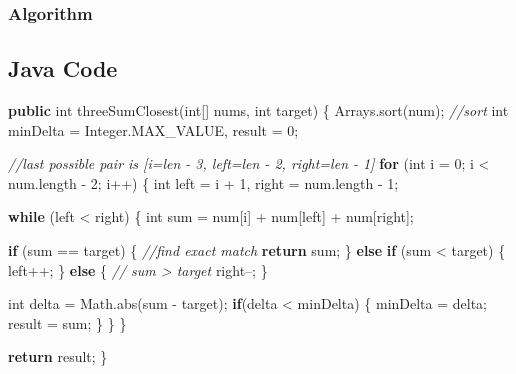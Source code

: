 \documentclass[]{book}
\newenvironment{Shaded}{\begin{snugshade}}{\end{snugshade}}
\newcommand{\BuiltInTok}[1]{#1}
\newcommand{\CommentTok}[1]{\textcolor[rgb]{0.56,0.35,0.01}{\textit{#1}}}
\newcommand{\DataTypeTok}[1]{\textcolor[rgb]{0.13,0.29,0.53}{#1}}
\newcommand{\DecValTok}[1]{\textcolor[rgb]{0.00,0.00,0.81}{#1}}
\newcommand{\FunctionTok}[1]{\textcolor[rgb]{0.00,0.00,0.00}{#1}}
\newcommand{\KeywordTok}[1]{\textcolor[rgb]{0.13,0.29,0.53}{\textbf{#1}}}
\newcommand{\NormalTok}[1]{#1}
\begin{document}
\hypertarget{algorithm-6}{%
\subsubsection{Algorithm}\label{algorithm-6}}

\hypertarget{java-code-4}{%
\subsection{Java Code}\label{java-code-4}}

\begin{Shaded}
\begin{Highlighting}[]
\KeywordTok{public} \DataTypeTok{int} \FunctionTok{threeSumClosest}\NormalTok{(}\DataTypeTok{int}\NormalTok{[] nums, }\DataTypeTok{int}\NormalTok{ target) \{}
    \BuiltInTok{Arrays}\NormalTok{.}\FunctionTok{sort}\NormalTok{(num); }\CommentTok{//sort}
    \DataTypeTok{int}\NormalTok{ minDelta = }\BuiltInTok{Integer}\NormalTok{.}\FunctionTok{MAX_VALUE}\NormalTok{, result = }\DecValTok{0}\NormalTok{;}

    \CommentTok{//last possible pair is [i=len - 3, left=len - 2, right=len - 1]}
    \KeywordTok{for}\NormalTok{ (}\DataTypeTok{int}\NormalTok{ i = }\DecValTok{0}\NormalTok{; i < num.}\FunctionTok{length}\NormalTok{ - }\DecValTok{2}\NormalTok{; i++) \{}
        \DataTypeTok{int}\NormalTok{ left = i + }\DecValTok{1}\NormalTok{, right = num.}\FunctionTok{length}\NormalTok{ - }\DecValTok{1}\NormalTok{;}

        \KeywordTok{while}\NormalTok{ (left < right) \{}
            \DataTypeTok{int}\NormalTok{ sum = num[i] + num[left] + num[right];}

            \KeywordTok{if}\NormalTok{ (sum == target) \{}
                \CommentTok{//find exact match}
                \KeywordTok{return}\NormalTok{ sum;}
\NormalTok{            \} }\KeywordTok{else} \KeywordTok{if}\NormalTok{ (sum < target) \{}
\NormalTok{                left++;}
\NormalTok{            \} }\KeywordTok{else}\NormalTok{ \{}
                \CommentTok{// sum > target}
\NormalTok{                right--;}
\NormalTok{            \}}

            \DataTypeTok{int}\NormalTok{ delta = }\BuiltInTok{Math}\NormalTok{.}\FunctionTok{abs}\NormalTok{(sum - target);}
            \KeywordTok{if}\NormalTok{(delta < minDelta) \{}
\NormalTok{                minDelta = delta;}
\NormalTok{                result = sum;}
\NormalTok{            \}}
\NormalTok{        \}}
\NormalTok{    \}}

    \KeywordTok{return}\NormalTok{ result;}
\NormalTok{\}}
\end{Highlighting}
\end{Shaded}
\end{document}
